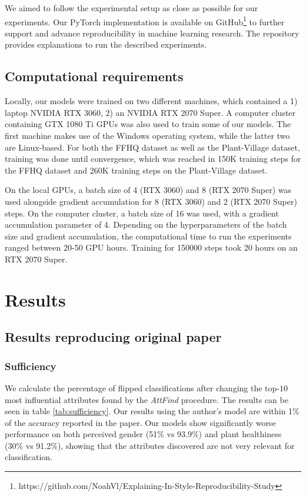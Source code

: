 We aimed to follow the experimental setup as close as possible for our experiments. Our PyTorch implementation is available on GitHub\footnote{https://github.com/NoahVl/Explaining-In-Style-Reproducibility-Study} to further support and advance reproducibility in machine learning research. The repository provides explanations to run the described experiments.


\subsection{Computational requirements}

Locally, our models were trained on two different machines, which contained a 1) laptop NVIDIA RTX 3060, 2) an NVIDIA RTX 2070 Super. A computer cluster containing GTX 1080 Ti GPUs was also used to train some of our models. The first machine makes use of the Windows operating system, while the latter two are Linux-based. For both the FFHQ dataset as well as the Plant-Village dataset, training was done until convergence, which was reached in 150K training steps for the FFHQ dataset and 260K training steps on the Plant-Village dataset.

On the local GPUs, a batch size of 4 (RTX 3060) and 8 (RTX 2070 Super) was used alongside gradient accumulation for 8 (RTX 3060) and 2 (RTX 2070 Super) steps. On the computer cluster, a batch size of 16 was used, with a gradient accumulation parameter of 4. Depending on the hyperparameters of the batch size and gradient accumulation, the computational time to run the experiments ranged between 20-50 GPU hours. Training for 150000 steps took 20 hours on an RTX 2070 Super.


\section{Results}
\label{sec:results}


\subsection{Results reproducing original paper}

\subsubsection{Sufficiency}

We calculate the percentage of flipped classifications after changing the top-$10$ most influential attributes found by the \textit{AttFind} procedure. The results can be seen in table \ref{tab:sufficiency}. Our results using the author's model are within 1\% of the accuracy reported in the paper. Our models show significantly worse performance on both perceived gender (51\% vs 93.9\%) and plant healthiness (30\% vs 91.2\%), showing that the attributes discovered are not very relevant for classification.

